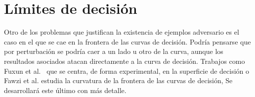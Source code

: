 



\section{Límites de decisión}

Otro de los problemas que justifican la existencia de ejemplos adversario es el caso en el que se cae en la frontera de las curvas de decisión. Podría pensarse que por perturbación se podría caer a un lado u otro de la curva, aunque los resultados asociados atacan directamente a la curva de decisión. Trabajos como Fuxun et al.~\cite{SuperfDecision} que se centra, de forma experimental, en la superficie de decisión o Fawzi et al.\cite{CurvLimites} estudia la curvatura de la frontera de las curvas de decisión, Se desarrollará este último con más detalle.


